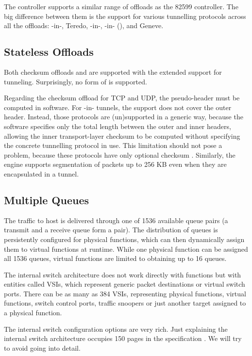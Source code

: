 The controller supports a similar range of offloads as the 82599 controller. The
big difference between them is the support for various tunnelling protocols
across all the offloads: -in-, Teredo, -in-,
-in- (),  and Geneve.

\subsection{Stateless Offloads}

Both checksum offloads and  are supported with the extended support for
tunneling. Surprisingly, no form of  is supported.

Regarding the checksum offload for TCP and UDP, the pseudo-header must be
computed in software. For -in- tunnels, the support does not
cover the outer  header. Instead, those protocols are (un)supported in
a generic way, because the software specifies only the total length between
the outer and inner  headers, allowing the inner transport-layer checksum to
be computed without specifying the concrete tunnelling protocol in use. This
limitation should not pose a problem, because these protocols have only
optional checksum . Similarly, the  engine
supports  segmentation of packets up to 256 KB even when they are
encapsulated in a tunnel.

\subsection{Multiple Queues}

The traffic to host is delivered through one of 1536 available queue pairs
(a transmit and a receive queue form a pair). The distribution of queues is
persistently configured for physical functions, which can then dynamically
assign them to virtual functions at runtime. While one physical function can be
assigned all 1536 queues, virtual functions are limited to obtaining up to 16 queues.

The internal switch architecture does not work directly with functions but with
entities called \glspl{VSI}, which represent generic packet destinations or
virtual switch ports. There can be as many as 384 \glspl{VSI},
representing physical functions, virtual functions, switch control ports,
traffic snoopers or just another target assigned to a physical function.

The internal switch configuration options are very rich. Just explaining the
internal switch architecture occupies 150 pages in the specification
. We will try to avoid going into detail.

